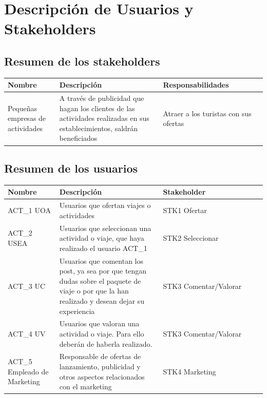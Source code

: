 \documentclass[11pt]{article}
\begin{document}
\section{Descripción de Usuarios y Stakeholders}

\subsection{Resumen de los stakeholders}
\begin{table}[H]
  \centering
  \begin{tabular}{p{0.2\linewidth}p{0.4\linewidth}p{0.4\linewidth}}
    \toprule
    \textbf{Nombre} & \textbf{Descripción} & \textbf{Responsabilidades} \\
    \midrule
    Pequeñas empresas de actividades & A través de publicidad que hagan los clientes de las actividades realizadas en sus establecimientos, saldrán beneficiados & Atraer a los turistas con sus ofertas\\
    \bottomrule
  \end{tabular}
\end{table}

\subsection{Resumen de los usuarios}
\begin{table}[H]
  \centering
  \begin{tabular}{p{0.2\linewidth}p{0.4\linewidth}p{0.4\linewidth}}
    \toprule
    \textbf{Nombre} & \textbf{Descripción} & \textbf{Stakeholder} \\
    \midrule
    ACT\_1 UOA & Usuarios que ofertan viajes o actividades & STK1 Ofertar\\
    ACT\_2 USEA & Usuarios que seleccionan una actividad o viaje, que haya realizado el usuario ACT\_1 & STK2 Seleccionar\\
    ACT\_3 UC & Usuarios que comentan los post, ya sea por que tengan dudas sobre el paquete de viaje o por que la han realizado y desean dejar su experiencia & STK3 Comentar/Valorar\\
    ACT\_4 UV & Usuarios que valoran una actividad o viaje. Para ello deberán de haberla realizado. & STK3 Comentar/Valorar\\
    ACT\_5  Empleado de Marketing & Responsable de ofertas de lanzamiento, publicidad y otros aspectos relacionados con el marketing & STK4 Marketing\\
    \bottomrule
  \end{tabular}
\end{table}
\end{document}
